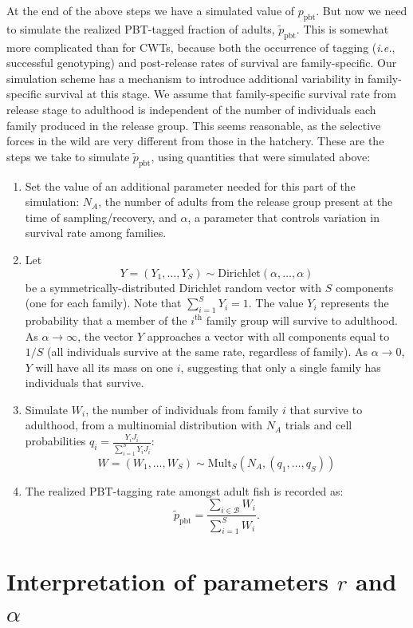 \documentclass[11pt]{article}
\newcommand{\thh}{^\mathrm{th}}
\newcommand{\ie}{{\em i.e.},\xspace }
\begin{document}
At the end of the above steps we have a simulated value of $p_\mathrm{pbt}$.  But now we
need to simulate the realized PBT-tagged fraction of adults, $\tilde{p}_\mathrm{pbt}$. 
This is somewhat more complicated than for CWTs, because both the occurrence of tagging (\ie successful genotyping)
and post-release rates of survival
are family-specific.  Our simulation scheme has a mechanism to introduce additional
variability in family-specific survival at this stage.  We assume that family-specific survival rate from release
stage to adulthood is independent of the number of individuals each family produced in the release
group.  This seems reasonable, as the selective forces in the wild are very different from those in the 
hatchery.    These are the steps we take to simulate $\tilde{p}_\mathrm{pbt}$, using
quantities that were simulated above:
\begin{enumerate}
\item Set the value of an additional parameter needed for this part of the simulation: $N_A$, the number
of adults from the release group present at the time of sampling/recovery, and $\alpha$,
a parameter that controls variation in survival rate among families. 
\item Let 
\[
Y = (Y_1,\ldots, Y_S) \sim \mathrm{Dirichlet}(\alpha, \ldots, \alpha)
\]
be a symmetrically-distributed Dirichlet random vector with $S$ components (one for each family).  Note that
$\sum_{i=1}^S Y_i =1$.  The value $Y_i$ represents the probability that a member of the $i\thh$ family group
will survive to adulthood.  As $\alpha \rightarrow \infty$, the vector $Y$ approaches a vector with
all components equal to $1/S$ (all individuals survive at the same rate, regardless of family).  As $\alpha
\rightarrow 0$, $Y$ will have all its mass on one $i$, suggesting that only a single family has individuals
that survive.
\item Simulate $W_i$, the number of individuals from family $i$
that survive to adulthood, from a multinomial distribution
with $N_A$ trials and cell probabilities $q_i = \frac{Y_i J_i}{\sum_{i=1}^S Y_i J_i}$:
\[
W = (W_1,\ldots, W_S) \sim \mathrm{Mult}_S(N_A, (q_1, \ldots, q_S))
\]
\item The realized PBT-tagging rate amongst adult fish is recorded as:
\[
\tilde{p}_\mathrm{pbt} = \frac{\sum_{i\in\mathcal{B}} W_i}{\sum_{i=1}^S W_i}.
\]
\end{enumerate}



\section{Interpretation of parameters $r$ and $\alpha$}
\end{document}
